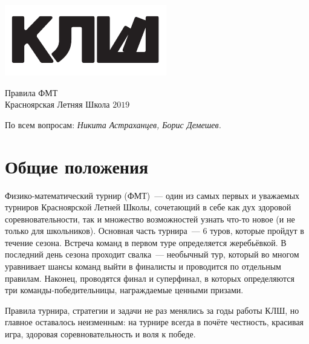 \documentclass[12pt]{article}
\begin{document}
\begin{flushleft}
\parbox[t][0pt]{0.2\textwidth}
{
{%
\vspace{0\baselineskip}
\includegraphics[scale=1.5]{klsh_logo_mod.pdf}\par
}
}
\end{flushleft}
\hfill
\parbox[t][0pt]{0.80\textwidth}
{
{\centering
\vspace{-1.5\baselineskip}
\begin{flushright}
{\Huge Правила ФМТ}\\
{Красноярская Летняя Школа $2019$}\par
По всем вопросам: {\it  Никита Астраханцев, Борис Демешев.}
\end{flushright}
}
}
\vspace{4\baselineskip}

\section*{Общие положения}
Физико-математический турнир (ФМТ)~--- один из самых первых и уважаемых турниров Красноярской Летней Школы, сочетающий в себе как дух здоровой соревновательности, так и множество возможностей узнать что-то новое (и не только для школьников). Основная часть турнира~--- 6 туров, которые пройдут в течение сезона. Встреча команд в первом туре определяется жеребьёвкой. В последний день сезона проходит свалка~--- необычный тур, который во многом уравнивает шансы команд выйти в финалисты и проводится по отдельным правилам. Наконец, проводятся финал и суперфинал, в которых определяются три команды-победительницы, награждаемые ценными призами.

Правила турнира, стратегии и задачи не раз менялись за годы работы КЛШ, но главное оставалось неизменным: на турнире всегда в почёте честность, красивая игра, здоровая соревновательность и воля к победе.
\end{document}
